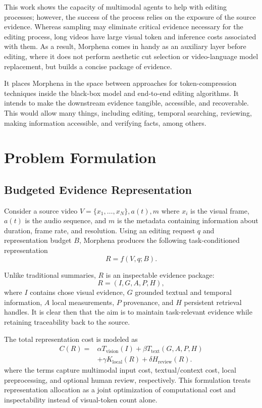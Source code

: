 \documentclass[conference]{IEEEtran}
\begin{document}
This work shows the capacity of multimodal agents to help with editing processes; however, the success of the process relies on the exposure of the source evidence. Whereas sampling may eliminate critical evidence necessary for the editing process, long videos have large visual token and inference costs associated with them. As a result, Morphena comes in handy as an auxiliary layer before editing, where it does not perform aesthetic cut selection or video-language model replacement, but builds a concise package of evidence.

It places Morphena in the space between approaches for token-compression techniques inside the black-box model and end-to-end editing algorithms. It intends to make the downstream evidence tangible, accessible, and recoverable. This would allow many things, including editing, temporal searching, reviewing, making information accessible, and verifying facts, among others.


\section{Problem Formulation}

\subsection{Budgeted Evidence Representation}

Consider a source video $V=\{x_1,\ldots,x_N\},a(t),m$ where $x_i$ is the visual frame, $a(t)$ is the audio sequence, and $m$ is the metadata containing information about duration, frame rate, and resolution. Using an editing request $q$ and representation budget $B$, Morphena produces the following task-conditioned representation
\begin{equation}
R=f(V,q;B).
\label{eq:representation}
\end{equation}

Unlike traditional summaries, $R$ is an inspectable evidence package:
\begin{equation}
R=(I,G,A,P,H),
\label{eq:package}
\end{equation}
where $I$ contains chose visual evidence, $G$ grounded textual and temporal information, $A$ local measurements, $P$ provenance, and $H$ persistent retrieval handles. It is clear then that the aim is to maintain task-relevant evidence while retaining traceability back to the source.

The total representation cost is modeled as
\begin{equation}
\begin{aligned}
C(R)={}&\alpha T_{\mathrm{vision}}(I)+\beta T_{\mathrm{text}}(G,A,P,H)\\
&+\gamma K_{\mathrm{local}}(R)+\delta H_{\mathrm{review}}(R).
\end{aligned}
\label{eq:cost}
\end{equation}
where the terms capture multimodal input cost, textual/context cost, local preprocessing, and optional human review, respectively. This formulation treats representation allocation as a joint optimization of computational cost and inspectability instead of visual-token count alone.
\end{document}
